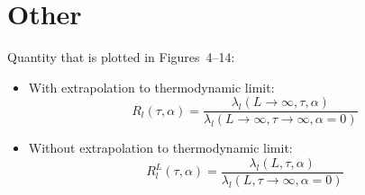 \section{Other}

\noindent Quantity that is plotted in Figures~4--14:
\begin{itemize}
    \item 
    With extrapolation to thermodynamic limit:
    \begin{equation}
        R_l(\tau,\alpha) = \frac{\lambda_l(L\rightarrow \infty,\tau,\alpha)}
        {\lambda_l(L\rightarrow \infty,\tau \rightarrow \infty,\alpha=0)}
        \label{eq:R1 extrap}
    \end{equation}
    \item
    Without extrapolation to thermodynamic limit:
    \begin{equation}
        R^L_l(\tau,\alpha) = \frac{\lambda_l(L,\tau,\alpha)}
        {\lambda_l(L,\tau \rightarrow \infty,\alpha=0)}
        \label{eq:R1 no extrap}
    \end{equation}
\end{itemize}


